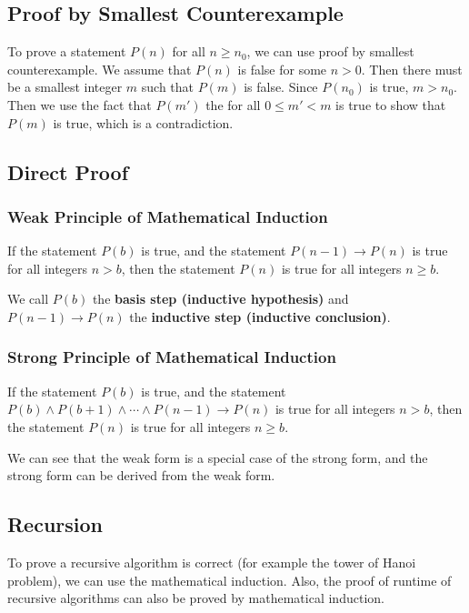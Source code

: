 \documentclass[a4paper,12pt]{article}
\begin{document}
\subsection{Proof by Smallest Counterexample}

To prove a statement $P(n)$ for all $n \geq n_0$, we can use proof by smallest counterexample.
We assume that $P(n)$ is false for some $n > 0$.
Then there must be a smallest integer $m$ such that $P(m)$ is false.
Since $P(n_0)$ is true, $m > n_0$.
Then we use the fact that $P(m')$ the for all $0 \leq m' < m$ is true to show that $P(m)$ is true, which is a contradiction.

\subsection{Direct Proof}

\subsubsection{Weak Principle of Mathematical Induction}

If the statement $P(b)$ is true, and the statement $P(n-1) \rightarrow P(n)$ is true for all integers $n > b$, then the statement $P(n)$ is true for all integers $n \geq b$.

We call $P(b)$ the \textbf{basis step (inductive hypothesis)} and $P(n-1) \rightarrow P(n)$ the \textbf{inductive step (inductive conclusion)}.

\subsubsection{Strong Principle of Mathematical Induction}

If the statement $P(b)$ is true, and the statement $P(b) \wedge P(b+1) \wedge \cdots \wedge P(n-1) \rightarrow P(n)$ is true for all integers $n > b$, then the statement $P(n)$ is true for all integers $n \geq b$.

We can see that the weak form is a special case of the strong form, and the strong form can be derived from the weak form.

\subsection{Recursion}

To prove a recursive algorithm is correct (for example the tower of Hanoi problem), we can use the mathematical induction.
Also, the proof of runtime of recursive algorithms can also be proved by mathematical induction.
\end{document}
